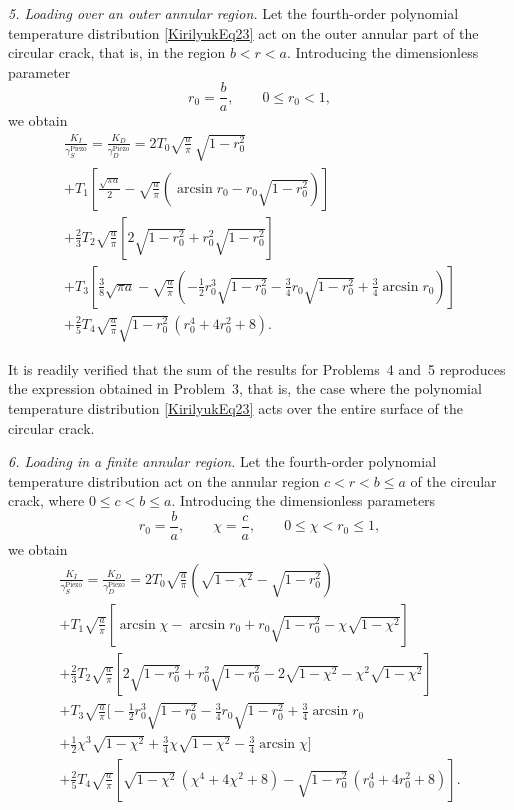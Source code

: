 \medskip
\emph{5. Loading over an outer annular region.} Let the fourth-order polynomial temperature distribution \eqref{KirilyukEq23} act on the outer annular part of the circular crack, that is, in the region $b<r<a$. Introducing the dimensionless parameter
\[
 r_0=\frac{b}{a}, \qquad 0\le  r_0<1,
\]
we obtain
\begin{multline}
	\frac{K_I}{\gamma_S^{\text{Piezo}}}
	=
	\frac{K_D}{\gamma_D^{\text{Piezo}}}
	=
	2T_0\sqrt{\frac{a}{\pi}}\,\sqrt{1- r_0^2}
\\
	+T_1\left[
	\frac{\sqrt{\pi a}}{2}
	-\sqrt{\frac{a}{\pi}}
	\left(
	\arcsin r_0- r_0\sqrt{1- r_0^2}
	\right)
	\right]
\\
	+\frac{2}{3}T_2\sqrt{\frac{a}{\pi}}
	\left[
	2\sqrt{1- r_0^2}
	+ r_0^2\sqrt{1- r_0^2}
	\right]
	\\
	+T_3\left[
	\frac{3}{8}\sqrt{\pi a}
	-\sqrt{\frac{a}{\pi}}
	\left(
	-\frac12 r_0^3\sqrt{1- r_0^2}
	-\frac34 r_0\sqrt{1- r_0^2}
	+\frac34\arcsin r_0
	\right)
	\right]
	\\
	+\frac{2}{5}T_4\sqrt{\frac{a}{\pi}}
	\sqrt{1- r_0^2}\,( r_0^4+4 r_0^2+8).
	\label{KirilyukEq26}
\end{multline}

It is readily verified that the sum of the results for Problems~4 and~5 reproduces the expression obtained in Problem~3, that is, the case where the polynomial temperature distribution \eqref{KirilyukEq23} acts over the entire surface of the circular crack.

\medskip
\emph{6. Loading in a finite annular region.} Let the fourth-order polynomial temperature distribution act on the annular region
$c<r<b\le a$ of the circular crack, where $0\le c<b\le a$.
Introducing the dimensionless parameters
\[
 r_0=\frac{b}{a}, \qquad \chi=\frac{c}{a}, \qquad 0\le \chi< r_0\le 1,
\]
we obtain
\begin{multline}
	\frac{K_I}{\gamma_S^{\text{Piezo}}}
	=
	\frac{K_D}{\gamma_D^{\text{Piezo}}}
	=
	2T_0\sqrt{\frac{a}{\pi}}
	\left(
	\sqrt{1-\chi^2}-\sqrt{1- r_0^2}
	\right)
	\\
	+T_1\sqrt{\frac{a}{\pi}}
	\left[
	\arcsin\chi-\arcsin r_0
	+ r_0\sqrt{1- r_0^2}
	-\chi\sqrt{1-\chi^2}
	\right]
	\\
	+\frac{2}{3}T_2\sqrt{\frac{a}{\pi}}
	\left[
	2\sqrt{1- r_0^2}
	+ r_0^2\sqrt{1- r_0^2}
	-2\sqrt{1-\chi^2}
	-\chi^2\sqrt{1-\chi^2}
	\right]
	\\
	+T_3\sqrt{\frac{a}{\pi}}
	\bigg[
	-\frac12  r_0^3\sqrt{1- r_0^2}
	-\frac34  r_0\sqrt{1- r_0^2}
	+\frac34 \arcsin r_0
	\\
	+\frac12 \chi^3\sqrt{1-\chi^2}
	+\frac34 \chi\sqrt{1-\chi^2}
	-\frac34 \arcsin\chi
	\bigg]
\\
	+\frac{2}{5}T_4\sqrt{\frac{a}{\pi}}
	\left[
	\sqrt{1-\chi^2}\,(\chi^4+4\chi^2+8)
	-\sqrt{1- r_0^2}\,( r_0^4+4 r_0^2+8)
	\right].
	\label{KirilyukEq27}
\end{multline}

